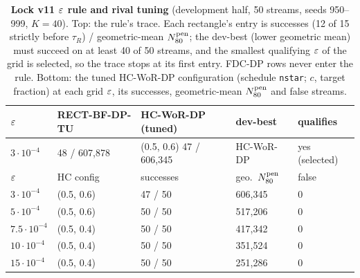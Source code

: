 \begin{table}[H]
\caption{\textbf{Lock v11 $\varepsilon$ rule and rival tuning} (development half, 50 streams, seeds 950--999, $K = 40$). Top: the rule's trace. Each rectangle's entry is successes (12 of 15 strictly before $\tau_R$) / geometric-mean $N_{80}^{\text{pen}}$; the dev-best (lower geometric mean) must succeed on at least 40 of 50 streams, and the smallest qualifying $\varepsilon$ of the grid is selected, so the trace stops at its first entry. FDC-DP rows never enter the rule. Bottom: the tuned HC-WoR-DP configuration (schedule \texttt{nstar}; $c$, target fraction) at each grid $\varepsilon$, its successes, geometric-mean $N_{80}^{\text{pen}}$ and false streams.}
\label{tab:v11eps}
\footnotesize
\setlength{\tabcolsep}{2.5pt}
\begin{tabular}{@{}lllll@{}}
\toprule
$\varepsilon$ & RECT-BF-DP-TU & HC-WoR-DP (tuned) & dev-best & qualifies \\
\midrule
$3\cdot 10^{-4}$ & 48 / 607,878 & (0.5, 0.6) 47 / 606,345 & HC-WoR-DP & yes (selected) \\
\midrule
$\varepsilon$ & HC config & successes & geo.\ $N_{80}^{\text{pen}}$ & false \\
\midrule
$3\cdot 10^{-4}$ & (0.5, 0.6) & 47 / 50 & 606,345 & 0 \\
$5\cdot 10^{-4}$ & (0.5, 0.6) & 50 / 50 & 517,206 & 0 \\
$7.5\cdot 10^{-4}$ & (0.5, 0.4) & 50 / 50 & 417,342 & 0 \\
$10\cdot 10^{-4}$ & (0.5, 0.4) & 50 / 50 & 351,524 & 0 \\
$15\cdot 10^{-4}$ & (0.5, 0.4) & 50 / 50 & 251,286 & 0 \\
\bottomrule
\end{tabular}
\end{table}
